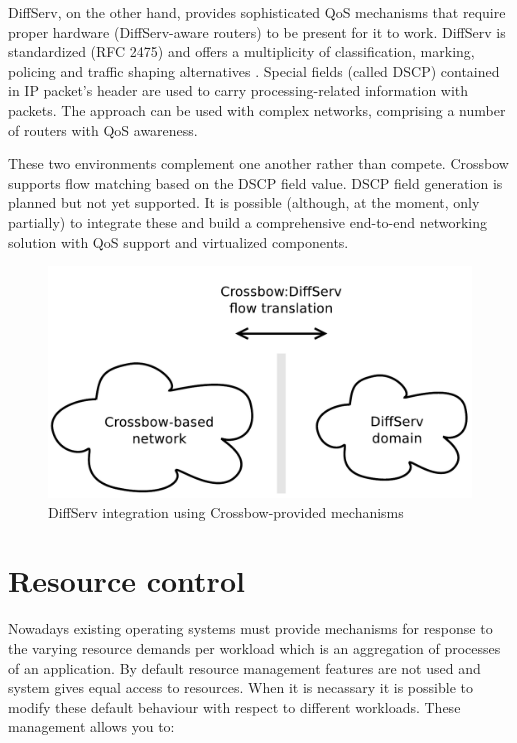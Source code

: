 \documentclass[11pt]{book}
\begin{document}
        DiffServ, on the other hand, provides sophisticated QoS mechanisms that require proper hardware (DiffServ-aware
        routers) to be present for it to work. DiffServ is standardized (RFC 2475) and offers a multiplicity of
        classification, marking, policing and traffic shaping alternatives \cite{rfc2475}. Special fields (called DSCP)
        contained in IP packet's header are used to carry processing-related information with packets. The approach can
        be used with complex networks, comprising a number of routers with QoS awareness.

        These two environments complement one another rather than compete. Crossbow supports flow matching based on the
        DSCP field value. DSCP field generation is planned but not yet supported. It is possible (although, at the
        moment, only partially) to integrate these and build a comprehensive end-to-end networking solution with QoS
        support and virtualized components.

        \begin{figure}[H]
          \begin{center}
            \includegraphics[width=.7\textwidth]{img/solaris/xbow-diffserv.pdf}
          \end{center}

          \caption{DiffServ integration using Crossbow-provided mechanisms}
        \end{figure}


    \section{Resource control}
    \label{sec:sol:res}


      Nowadays existing operating systems must provide mechanisms for response to the varying resource demands per
      workload which is an aggregation of processes of an application. By default resource management features are not
      used and system gives equal access to resources. When it is necassary it is possible to modify these default
      behaviour with respect to different workloads. These management allows you to:
\end{document}
